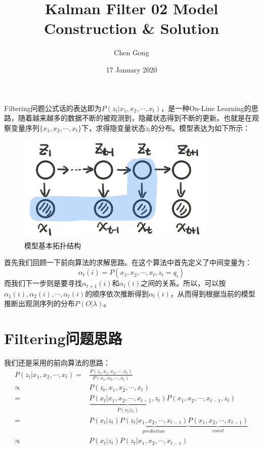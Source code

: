 \documentclass[a4paper]{article}
\title{Kalman Filter 02 Model Construction \& Solution}
\author{Chen Gong}
\date{17 January 2020}
\begin{document}
\maketitle
Filtering问题公式话的表达即为$P(z_t|x_1,x_2,\cdots,x_t)$，是一种On-Line Learning的思路，随着越来越多的数据不断的被观测到，隐藏状态得到不断的更新。也就是在观察变量序列$\{x_1,x_2,\cdots,x_t\}$下，求得隐变量状态$z_t$的分布。模型表达为如下所示：
\begin{figure}[H]
    \centering
    \includegraphics[width=.4\textwidth]{微信图片_20200116123639.png}
    \caption{模型基本拓扑结构}
    \label{fig:my_label_1}
\end{figure}

首先我们回顾一下前向算法的求解思路。在这个算法中首先定义了中间变量为：
\begin{equation}
    \alpha_t(i) = P(x_1,x_2,\cdots,x_t,z_t=q_i)
\end{equation}
而我们下一步则是要寻找$\alpha_{t+1}(i)$和$\alpha_t(i)$之间的关系。所以，可以按$\alpha_{1}(i),\alpha_{2}(i),\cdots,\alpha_{t}(i)$的顺序依次推断得到$\alpha_{t}(i)$，从而得到根据当前的模型推断出观测序列的分布$P(O|\lambda)$。

\section{Filtering问题思路}
我们还是采用的前向算法的思路：
\begin{equation}
    \begin{split}
        P(z_t|x_1,x_2,\cdots,x_t) 
        = & \frac{P(z_t,x_1,x_2,\cdots,x_t)}{P(x_1,x_2,\cdots,x_t)}  \\
        \propto & P(z_t,x_1,x_2,\cdots,x_t) \\
        = & \underbrace{P(x_t|x_1,x_2,\cdots,x_{t-1},z_t)}_{P(x_t|z_t)}P(x_1,x_2,\cdots,x_{t-1},z_t) \\
        = & P(x_t|z_t)\underbrace{P(z_t|x_1,x_2,\cdots,x_{t-1})}_{prediction}\underbrace{P(x_1,x_2,\cdots,x_{t-1})}_{const} \\
        \propto & P(x_t|z_t)P(z_t|x_1,x_2,\cdots,x_{t-1})
    \end{split}
\end{equation}
\end{document}

